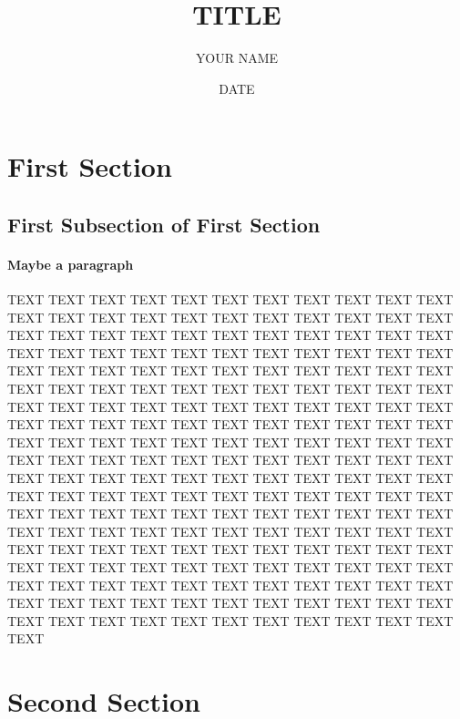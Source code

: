 \documentclass[11pt,a4paper]{article}
\begin{document}
\title{TITLE}
\author{YOUR NAME}
\date{DATE}

\maketitle


\section{First Section}

\subsection{First Subsection of First Section}

\paragraph{Maybe a paragraph}

TEXT TEXT TEXT TEXT TEXT TEXT TEXT TEXT TEXT TEXT TEXT TEXT TEXT TEXT
TEXT TEXT TEXT TEXT TEXT TEXT TEXT TEXT TEXT TEXT TEXT TEXT TEXT TEXT
TEXT TEXT TEXT TEXT TEXT TEXT TEXT TEXT TEXT TEXT TEXT TEXT TEXT TEXT
TEXT TEXT TEXT TEXT TEXT TEXT TEXT TEXT TEXT TEXT TEXT TEXT TEXT TEXT
TEXT TEXT TEXT TEXT TEXT TEXT TEXT TEXT TEXT TEXT TEXT TEXT TEXT TEXT
TEXT TEXT TEXT TEXT TEXT TEXT TEXT TEXT TEXT TEXT TEXT TEXT TEXT TEXT
TEXT TEXT TEXT TEXT TEXT TEXT TEXT TEXT TEXT TEXT TEXT TEXT TEXT TEXT
TEXT TEXT TEXT TEXT TEXT TEXT TEXT TEXT TEXT TEXT TEXT TEXT TEXT TEXT
TEXT TEXT TEXT TEXT TEXT TEXT TEXT TEXT TEXT TEXT TEXT TEXT TEXT TEXT
TEXT TEXT TEXT TEXT TEXT TEXT TEXT TEXT TEXT TEXT TEXT TEXT TEXT TEXT
TEXT TEXT TEXT TEXT TEXT TEXT TEXT TEXT TEXT TEXT TEXT TEXT TEXT TEXT
TEXT TEXT TEXT TEXT TEXT TEXT TEXT TEXT TEXT TEXT TEXT TEXT TEXT TEXT
TEXT TEXT TEXT TEXT TEXT TEXT TEXT TEXT TEXT TEXT TEXT TEXT TEXT TEXT
TEXT TEXT TEXT TEXT TEXT TEXT TEXT TEXT TEXT TEXT TEXT TEXT TEXT TEXT
TEXT TEXT TEXT TEXT TEXT TEXT TEXT TEXT TEXT TEXT TEXT TEXT TEXT TEXT

\section{Second Section}





\end{document}
